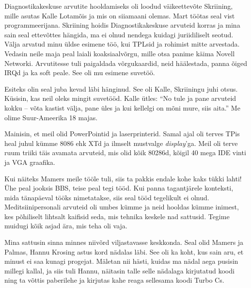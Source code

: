 
Diagnostikakeskuse arvutite hooldamiseks oli loodud väikeettevõte 
Skriining, mille asutas Kalle 
Lotamõis ja mis on siiamaani olemas. Mart töötas seal vist programmeerijana.
Skriining hoidis Diagnostikakeskuse arvuteid korras ja mina sain seal ettevõttes
hängida, ma ei olnud nendega kuidagi juriidiliselt seotud. 
Välja arvatud minu üldse esimene töö, kui TPLsid ja rohimist mitte arvestada. Vedasin neile maja peal laiali koaksiaalvõrgu, mille otsa panime käima 
Novell Networki. Arvutitesse tuli paigaldada võrgukaardid, neid häälestada, panna 
õiged IRQd ja ka soft peale. See oli mu 
esimene suvetöö.


Esiteks olin seal juba kevad läbi hänginud. See oli 
Kalle, Skriiningu juhi otsus. 
Küsisin, kas neil oleks mingit suvetööd. Kalle ütles: \enquote{No tule ja pane 
arvuteid kokku -- võta kastist välja, pane üles ja kui kellelgi on 
mõni mure, siis aita.} Me olime Suur-Ameerika 18 majas. 

Mainisin, et meil olid PowerPointid ja laserprinterid. Samal ajal oli terves TPis heal 
juhul kümme 8086 ehk XTd ja ilmselt mustvalge 
\emph{display}'ga. Meil oli terve ruum triiki täis 
avamata arvuteid, mis olid kõik 80286d, kõigil 40 mega IDE vinti ja VGA 
graafika. 

Kui näiteks Mamers meile tööle tuli, 
siis ta pakkis endale kohe kaks tükki lahti! Ühe peal jooksis BBS, teise 
peal tegi tööd. Kui panna 
tagantjärele konteksti, mida tänapäeval tööks nimetatakse, siis seal tööd 
tegelikult ei olnud. Meditsiinipersonali arvuteid oli 
umbes kümme ja neid hooldas kümme inimest, kes põhiliselt 
lihtsalt kaifisid seda, mis tehnika keskele nad sattusid. Tegime 
muidugi kõik asjad ära, mis teha oli vaja. 

Mina sattusin sinna minnes niivõrd viljastavasse keskkonda. Seal 
olid Mamers ja Palmas, 
Hannu Krosing astus kord nädalas läbi. See oli ka 
koht, kus sain aru, et minust ei saa kunagi progejat. Mäletan nii 
hästi, kuidas ma nädal aega pusisin millegi kallal, ja siis tuli Hannu, näitasin 
talle selle nädalaga kirjutatud koodi ning ta võttis paberilehe ja 
kirjutas kahe reaga sellesama koodi Turbo Cs.

